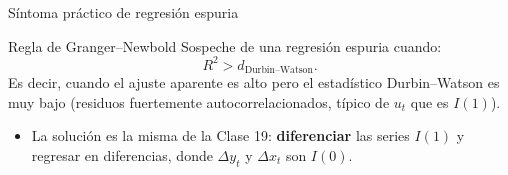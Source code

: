 \documentclass{beamer}
\begin{document}
\begin{frame}{Síntoma práctico de regresión espuria}

\begin{block}{Regla de Granger--Newbold}
Sospeche de una regresión espuria cuando:
\[
R^2 > d_{\text{Durbin--Watson}}.
\]
Es decir, cuando el ajuste aparente es alto pero el estadístico Durbin--Watson es muy bajo (residuos fuertemente autocorrelacionados, típico de $u_t$ que es $I(1)$).
\end{block}

\begin{itemize}
  \item La solución es la misma de la Clase 19: \textbf{diferenciar} las series $I(1)$ y regresar en diferencias, donde $\Delta y_t$ y $\Delta x_t$ son $I(0)$.
\end{itemize}

\end{frame}
\end{document}
